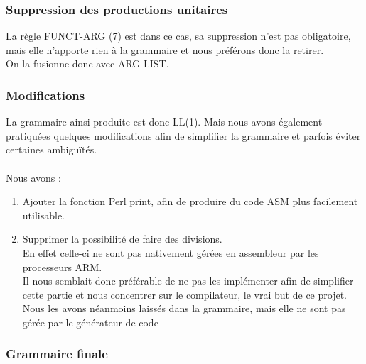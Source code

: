 \documentclass[a4paper,10pt]{article}
\begin{document}
\subsubsection{Suppression des productions unitaires}
	La règle FUNCT-ARG (7) est dans ce cas, sa suppression n'est pas obligatoire, mais elle n'apporte rien à la grammaire et nous préférons donc la retirer.\\
	On la fusionne donc avec ARG-LIST.\\

\subsubsection{Modifications}
	La grammaire ainsi produite est donc LL(1).
	Mais nous avons également pratiquées quelques modifications afin de simplifier la grammaire et parfois éviter certaines ambiguïtés.\\
	~\\
	Nous avons : \begin{enumerate}
		\item Ajouter la fonction Perl print, afin de produire du code ASM plus facilement utilisable.			
		\item Supprimer la possibilité de faire des divisions.\\
			En effet celle-ci ne sont pas nativement gérées en assembleur par les processeurs ARM.\\
			Il nous semblait donc préférable de ne pas les implémenter afin de simplifier cette partie et nous concentrer sur le compilateur, le vrai but de ce projet. Nous les avons néanmoins laissés dans la grammaire, mais elle ne sont pas gérée par le générateur de code\\	
	\end{enumerate}


\subsubsection{Grammaire finale}
\end{document}
